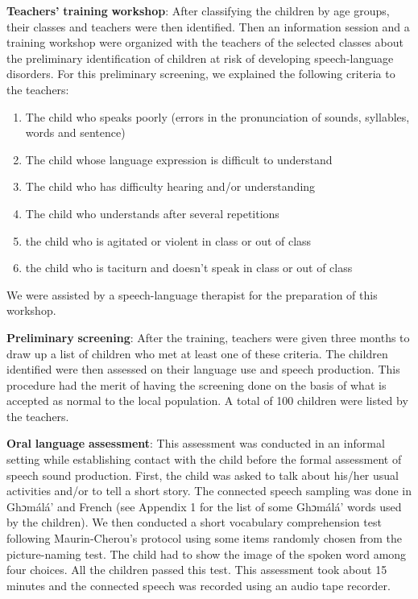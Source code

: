 \documentclass[output=paper,newtxmath,modfonts,nonflat,draftmode]{langsci/langscibook}
\begin{document}
\textbf{Teachers’} \textbf{training} \textbf{workshop}: After classifying the children by age groups, their classes and teachers were then identified. Then an information session and a training workshop were organized with the teachers of the selected classes about the preliminary identification of children at risk of developing speech-language disorders. For this preliminary screening, we explained the following criteria to the teachers:

\begin{enumerate}
    \item The child who speaks poorly (errors in the pronunciation of sounds, syllables, words and sentence)
    \item The child whose language expression is difficult to understand
    \item The child who has difficulty hearing and/or understanding
    \item The child who understands after several repetitions
    \item the child who is agitated or violent in class or out of class
    \item the child who is taciturn and doesn’t speak in class or out of class
\end{enumerate}

We were assisted by a speech-language therapist for the preparation of this workshop. 

\textbf{Preliminary} \textbf{screening}: After the training, teachers were given three months to draw up a list of children who met at least one of these criteria. The children identified were then assessed on their language use and speech production. This procedure had the merit of having the screening done on the basis of what is accepted as normal to the local population. A total of 100 children were listed by the teachers.

\textbf{Oral} \textbf{language} \textbf{assessment}: This assessment was conducted in an informal setting while establishing contact with the child before the formal assessment of speech sound production. First, the child was asked to talk about his/her usual activities and/or to tell a short story. The connected speech sampling was done in Ghɔmálá’ and French (see Appendix 1 for the list of some Ghɔmálá’ words used by the children). We then conducted a short vocabulary comprehension test following Maurin-Cherou’s protocol using some items randomly chosen from the picture-naming test. The child had to show the image of the spoken word among four choices. All the children passed this test. This assessment took about 15 minutes and the connected speech was recorded using an audio tape recorder. 
\end{document}

